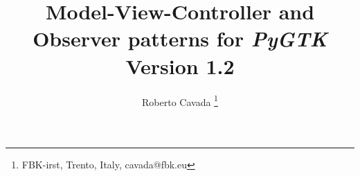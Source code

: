 \documentclass{article}
\newcommand{\appl}[1]{\textsl{#1}\xspace}
\newcommand{\pygtk}{\appl{PyGTK}}
\begin{document}
\title{Model-View-Controller and Observer patterns for \pygtk \\
Version 1.2}

\author{ Roberto Cavada \thanks{FBK-irst, Trento, Italy,
 cavada@fbk.eu} }

\maketitle

\tableofcontents

\newpage



\newpage


\newpage


\newpage


\newpage


\newpage


\newpage


\newpage

\end{document}
